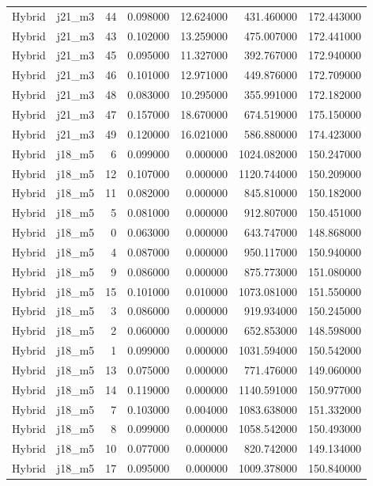 \begin{tabular}{llrrrrr}
Hybrid & j21_m3 & 44 & 0.098000 & 12.624000 & 431.460000 & 172.443000 \\
Hybrid & j21_m3 & 43 & 0.102000 & 13.259000 & 475.007000 & 172.441000 \\
Hybrid & j21_m3 & 45 & 0.095000 & 11.327000 & 392.767000 & 172.940000 \\
Hybrid & j21_m3 & 46 & 0.101000 & 12.971000 & 449.876000 & 172.709000 \\
Hybrid & j21_m3 & 48 & 0.083000 & 10.295000 & 355.991000 & 172.182000 \\
Hybrid & j21_m3 & 47 & 0.157000 & 18.670000 & 674.519000 & 175.150000 \\
Hybrid & j21_m3 & 49 & 0.120000 & 16.021000 & 586.880000 & 174.423000 \\
Hybrid & j18_m5 & 6 & 0.099000 & 0.000000 & 1024.082000 & 150.247000 \\
Hybrid & j18_m5 & 12 & 0.107000 & 0.000000 & 1120.744000 & 150.209000 \\
Hybrid & j18_m5 & 11 & 0.082000 & 0.000000 & 845.810000 & 150.182000 \\
Hybrid & j18_m5 & 5 & 0.081000 & 0.000000 & 912.807000 & 150.451000 \\
Hybrid & j18_m5 & 0 & 0.063000 & 0.000000 & 643.747000 & 148.868000 \\
Hybrid & j18_m5 & 4 & 0.087000 & 0.000000 & 950.117000 & 150.940000 \\
Hybrid & j18_m5 & 9 & 0.086000 & 0.000000 & 875.773000 & 151.080000 \\
Hybrid & j18_m5 & 15 & 0.101000 & 0.010000 & 1073.081000 & 151.550000 \\
Hybrid & j18_m5 & 3 & 0.086000 & 0.000000 & 919.934000 & 150.245000 \\
Hybrid & j18_m5 & 2 & 0.060000 & 0.000000 & 652.853000 & 148.598000 \\
Hybrid & j18_m5 & 1 & 0.099000 & 0.000000 & 1031.594000 & 150.542000 \\
Hybrid & j18_m5 & 13 & 0.075000 & 0.000000 & 771.476000 & 149.060000 \\
Hybrid & j18_m5 & 14 & 0.119000 & 0.000000 & 1140.591000 & 150.977000 \\
Hybrid & j18_m5 & 7 & 0.103000 & 0.004000 & 1083.638000 & 151.332000 \\
Hybrid & j18_m5 & 8 & 0.099000 & 0.000000 & 1058.542000 & 150.493000 \\
Hybrid & j18_m5 & 10 & 0.077000 & 0.000000 & 820.742000 & 149.134000 \\
Hybrid & j18_m5 & 17 & 0.095000 & 0.000000 & 1009.378000 & 150.840000 \\

\end{tabular}
